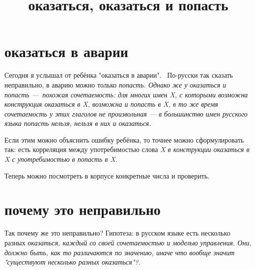 \documentclass[a4paper]{article}
\title{оказаться, оказаться и попасть}
\begin{document}
\section{оказаться в аварии}
Сегодня я услышал от ребёнка "оказаться в аварии".
 По-русски так сказать неправильно, в аварию можно только \em{попасть}.
Однако же у \em{оказаться} и \em{попасть} — похожая сочетаемость: для многих имен \em{X}, с которыми возможна конструкция \em{оказаться в X}, возможна и \em{попасть в X}, в то же время сочетаемость у этих глаголов не произвольная — в большинство имен русского языка \em{попасть} нельзя, нельзя в них и \em{оказаться}.

Если этим можно объяснить ошибку ребёнка, то точнее можно сформулировать так: есть корреляция между употребимостью слова \em{X} в конструкции \em{оказаться в X} с употребимостью в \em{попасть в X}.

Теперь можно посмотреть в корпусе конкретные числа и проверить.
\section{почему это неправильно}
Так почему же это неправильно?
Гипотеза: в русском языке есть несколько разных \em{оказаться}, каждый со своей сочетаемостью и моделью управления. Они, должно быть, как то различаются по значению, иначе что вообще значит "существуют несколько разных оказаться"?.
\end{document}
